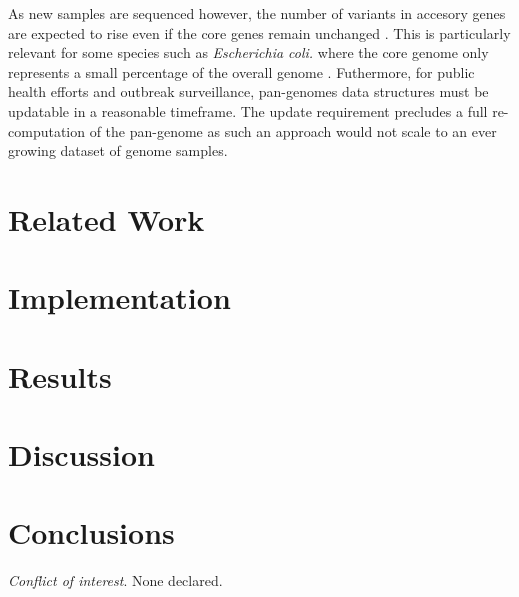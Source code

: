 \documentclass{article}
\begin{document}

As new samples are sequenced however, the number of variants in accesory genes are expected to rise even if the core genes remain unchanged \cite{medini2005microbial}.
This is particularly relevant for some species such as \textit{Escherichia coli.} where the core genome only represents a small percentage of the overall genome \cite{fukiya2004extensive}.
Futhermore, for public health efforts and outbreak surveillance, pan-genomes data structures must be updatable in a reasonable timeframe.
The update requirement precludes a full re-computation of the pan-genome as such an approach would not scale to an ever growing dataset of genome samples.


\enlargethispage{-65.1pt}

\section{Related Work}



\section{Implementation}

\section{Results}

\section{Discussion}


\section{Conclusions}


\textit{Conflict of interest}. None declared.

\newpage



\end{document}
